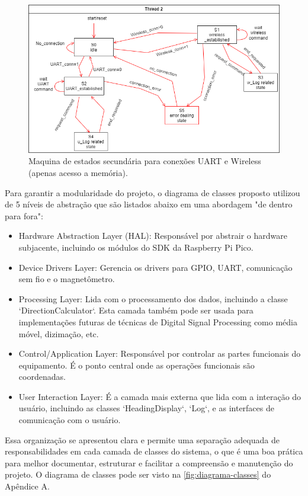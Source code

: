 \documentclass[10pt,twocolumn,letterpaper]{article}
\begin{document}
\begin{figure}[h]
  \centering
  \includegraphics[width=\linewidth]{figures/maquina_estados2.2.png}
  \caption{Maquina de estados secundária para conexões UART e Wireless (apenas acesso a memória).}
  \label{fig:maquina_estados2}
\end{figure}


Para garantir a modularidade do projeto, o diagrama de classes proposto utilizou de 5 níveis de abstração que são listados 
abaixo em uma abordagem "de dentro para fora":
\begin{itemize}
  \item Hardware Abstraction Layer (HAL): Responsável por abstrair o hardware subjacente, incluindo os módulos do SDK da Raspberry Pi Pico.
  \item Device Drivers Layer: Gerencia os drivers para GPIO, UART, comunicação sem fio e o magnetômetro.
  \item Processing Layer: Lida com o processamento dos dados, incluindo a classe `DirectionCalculator`. Esta camada também pode ser usada 
  para implementações futuras de técnicas de Digital Signal Processing como média móvel, dizimação, etc.
  \item Control/Application Layer: Responsável por controlar as partes funcionais do equipamento. É o ponto central onde as operações 
  funcionais são coordenadas. 
  \item User Interaction Layer: É a camada mais externa que lida com a interação do usuário, incluindo as classes `HeadingDisplay`, `Log`, 
  e as interfaces de comunicação com o usuário.
\end{itemize}
Essa organização se apresentou clara e permite uma separação adequada de responsabilidades em cada camada de classes do sistema, 
o que é uma boa prática para melhor documentar, estruturar e facilitar a compreensão e manutenção do projeto. O diagrama de classes 
pode ser visto na \autoref{fig:diagrama-classes} do Apêndice A. \\ \\
\end{document}
